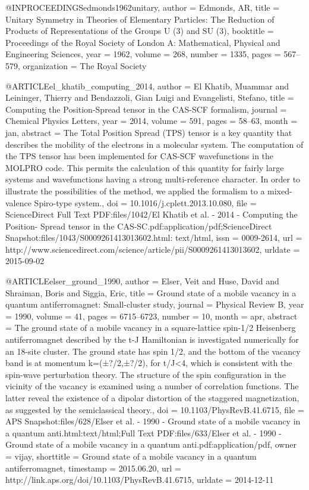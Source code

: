 @INPROCEEDINGS{edmonds1962unitary,
  author = {Edmonds, AR},
  title = {Unitary Symmetry in Theories of Elementary Particles: The Reduction
	of Products of Representations of the Groups U (3) and SU (3)},
  booktitle = {Proceedings of the Royal Society of London A: Mathematical, Physical
	and Engineering Sciences},
  year = {1962},
  volume = {268},
  number = {1335},
  pages = {567--579},
  organization = {The Royal Society}
}

@ARTICLE{el_khatib_computing_2014,
  author = {El Khatib, Muammar and Leininger, Thierry and Bendazzoli, Gian Luigi
	and Evangelisti, Stefano},
  title = {Computing the {Position}-{Spread} tensor in the {CAS}-{SCF} formalism},
  journal = {Chemical Physics Letters},
  year = {2014},
  volume = {591},
  pages = {58--63},
  month = jan,
  abstract = {The Total Position Spread (TPS) tensor is a key quantity that describes
	the mobility of the electrons in a molecular system. The computation
	of the TPS tensor has been implemented for CAS-SCF wavefunctions
	in the MOLPRO code. This permits the calculation of this quantity
	for fairly large systems and wavefunctions having a strong multi-reference
	character. In order to illustrate the possibilities of the method,
	we applied the formalism to a mixed-valence Spiro-type system.},
  doi = {10.1016/j.cplett.2013.10.080},
  file = {ScienceDirect Full Text PDF:files/1042/El Khatib et al. - 2014 - Computing the Position-      Spread tensor in the CAS-SC.pdf:application/pdf;ScienceDirect Snapshot:files/1043/S0009261413013602.html: text/html},
  issn = {0009-2614},
  url = {http://www.sciencedirect.com/science/article/pii/S0009261413013602},
  urldate = {2015-09-02}
}

@ARTICLE{elser_ground_1990,
  author = {Elser, Veit and Huse, David and Shraiman, Boris and Siggia, Eric},
  title = {Ground state of a mobile vacancy in a quantum antiferromagnet: {Small}-cluster
	study},
  journal = {Physical Review B},
  year = {1990},
  volume = {41},
  pages = {6715--6723},
  number = {10},
  month = apr,
  abstract = {The ground state of a mobile vacancy in a square-lattice spin-1/2
	Heisenberg antiferromagnet described by the t-J Hamiltonian is investigated
	numerically for an 18-site cluster. The ground state has spin 1/2,
	and the bottom of the vacancy band is at momentum k=(±?/2,±?/2),
	for t/J{\textless}4, which is consistent with the spin-wave perturbation
	theory. The structure of the spin configuration in the vicinity of
	the vacancy is examined using a number of correlation functions.
	The latter reveal the existence of a dipolar distortion of the staggered
	magnetization, as suggested by the semiclassical theory.},
  doi = {10.1103/PhysRevB.41.6715},
  file = {APS Snapshot:files/628/Elser et al. - 1990 - Ground state of a mobile vacancy in a quantum anti.html:text/html;Full Text PDF:files/633/Elser et al. - 1990 - Ground state of a mobile vacancy in a quantum anti.pdf:application/pdf},
  owner = {vijay},
  shorttitle = {Ground state of a mobile vacancy in a quantum antiferromagnet},
  timestamp = {2015.06.20},
  url = {http://link.aps.org/doi/10.1103/PhysRevB.41.6715},
  urldate = {2014-12-11}
}

